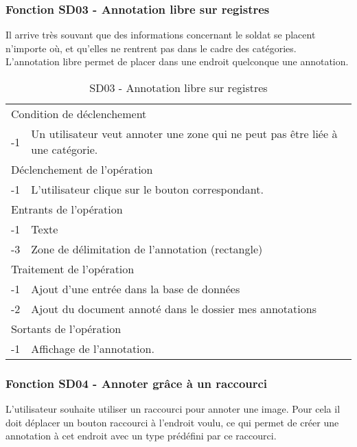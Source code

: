 \documentclass[a4paper]{article}
\begin{document}
\subsubsection{Fonction SD03 - Annotation libre sur registres}
Il arrive tr\`es souvant que des informations concernant le soldat se placent n'importe o\`u, et qu'elles ne rentrent pas dans le cadre des cat\'egories. L'annotation libre permet de placer dans une endroit quelconque une annotation. \\

\begin{table}[H]
  \centering
   \small
	\begin{tabular}{|c|p{12cm}|}
   		\hline
   			\rowcolor{lightgray}\multicolumn{2}{|c|}{\textbf{SD03 - Annotation libre sur registres}} \\
   		\hline
   			\multicolumn{2}{|l|}{Condition de d\'eclenchement} \\
   		\hline
   		-1 & Un utilisateur veut annoter une zone qui ne peut pas \^etre li\'ee \`a une cat\'egorie. \\
   		\hline
   			\multicolumn{2}{|l|}{D\'eclenchement de l'op\'eration} \\
   		\hline
   			-1 & L'utilisateur clique sur le bouton correspondant. \\
   		\hline
   			\multicolumn{2}{|l|}{Entrants de l'op\'eration} \\
   		\hline
   			-1 & Texte \\
        	-3 & Zone de d\'elimitation de l'annotation (rectangle) \\
   		\hline
   			\multicolumn{2}{|l|}{Traitement de l'op\'eration} \\
  		\hline
   			-1 & Ajout d'une entr\'ee dans la base de donn\'ees \\
            -2 & Ajout du document annot\'e dans le dossier mes annotations \\
   		\hline
   			\multicolumn{2}{|l|}{Sortants de l'op\'eration} \\
   		\hline
   			-1 & Affichage de l'annotation. \\
   		\hline
	\end{tabular}
  \caption{SD03 - Annotation libre sur registres}
  \normalsize
  \label{tab:annotation_libre}
\end{table}

\subsubsection{Fonction SD04 - Annoter grâce à un raccourci}
L’utilisateur souhaite utiliser un raccourci pour annoter une image. Pour cela il doit déplacer un bouton raccourci à l’endroit voulu, ce qui permet de créer une annotation à cet endroit avec un type prédéfini par ce raccourci.\\
\end{document}
